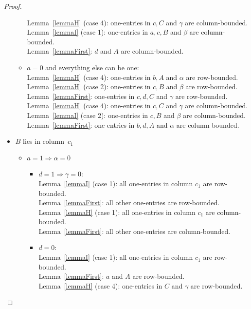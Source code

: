 \begin{proof}
\begin{itemize}
\begin{itemize}
			Lemma~\ref{lemmaH} (case 4): one-entries in $c,C$ and $\gamma$ are column-bounded.\\
			Lemma~\ref{lemmaI} (case 1): one-entries in $a,c,B$ and $\beta$ are column-bounded.\\
			Lemma~\ref{lemmaFirst}: $d$ and $A$ are column-bounded.
		\item $a=0$ and everything else can be one:\\
			Lemma~\ref{lemmaH} (case 4): one-entries in $b,A$ and $\alpha$ are row-bounded.\\
			Lemma~\ref{lemmaH} (case 2): one-entries in $c,B$ and $\beta$ are row-bounded.\\
			Lemma~\ref{lemmaFirst}: one-entries in $c,d,C$ and $\gamma$ are row-bounded.\\
			
			Lemma~\ref{lemmaH} (case 4): one-entries in $c,C$ and $\gamma$ are column-bounded.\\
			Lemma~\ref{lemmaI} (case 2): one-entries in $c,B$ and $\beta$ are column-bounded.\\
			Lemma~\ref{lemmaFirst}: one-entries in $b,d,A$ and $\alpha$ are column-bounded.			
	\end{itemize}
\item $B$ lies in column~$c_1$
	\begin{itemize}
		\item $a=1\Rightarrow\alpha=0$
			\begin{itemize}
				\item $d=1\Rightarrow\gamma=0$:\\
					Lemma~\ref{lemmaI} (case 1): all one-entries in column $c_1$ are row-bounded.\\
					Lemma~\ref{lemmaFirst}: all other one-entries are row-bounded.\\
					
					Lemma~\ref{lemmaH} (case 1): all one-entries in column $c_1$ are column-bounded.\\
					Lemma~\ref{lemmaFirst}: all other one-entries are column-bounded.
				\item $d=0$:\\
					Lemma~\ref{lemmaI} (case 1): all one-entries in column $c_1$ are row-bounded.\\
					Lemma~\ref{lemmaFirst}: $a$ and $A$ are row-bounded.\\
					Lemma~\ref{lemmaH} (case 4): one-entries in $C$ and $\gamma$ are row-bounded.\\
					

\end{itemize}
\end{itemize}
\end{itemize}
\end{proof}
